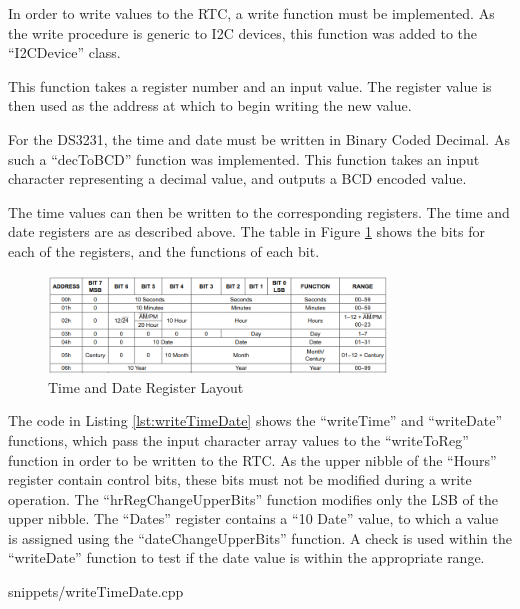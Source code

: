 In order to write values to the RTC, a write function must be implemented. As
the write procedure is generic to I2C devices, this function was added to the
``I2CDevice'' class.



This function takes a register number and an input value. The register value is
then used as the address at which to begin writing the new value.

For the DS3231, the time and date must be written in Binary Coded Decimal. As
such a ``decToBCD'' function was implemented. This function takes an input
character representing a decimal value, and outputs a BCD encoded value.



The time values can then be written to the corresponding registers. The time and
date registers are as described above. The table in Figure
\ref{fig:images-timeDateRegisters} shows the bits for each of the registers, and
the functions of each bit.

\begin{figure}[H]
	\centering
	\includegraphics[width=0.8\textwidth]{images/timeDateRegisters}
	\caption{Time and Date Register Layout}
	\label{fig:images-timeDateRegisters}
\end{figure}

The code in Listing \ref{lst:writeTimeDate} shows the ``writeTime'' and
``writeDate'' functions, which pass the input character array values to the
``writeToReg'' function in order to be written to the RTC. As the upper nibble
of the ``Hours'' register contain control bits, these bits must not be modified
during a write operation. The ``hrRegChangeUpperBits'' function modifies only
the LSB of the upper nibble. The ``Dates'' register contains a ``10 Date''
value, to which a value is assigned using the ``dateChangeUpperBits'' function.
A check is used within the ``writeDate'' function to test if the date value is
within the appropriate range.


{snippets/writeTimeDate.cpp}
